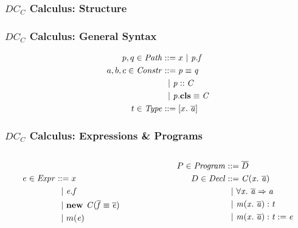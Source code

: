\begin{frame}
\frametitle{$DC_C$ Calculus: Structure}
\centering
{}
\end{frame}

\begin{frame}
\frametitle{$DC_C$ Calculus: General Syntax}

\begin{align*}
p, q \in \mathit{Path} &::= x \ |\ \mathit{p.f}\\
a, b, c \in \mathit{Constr} &::= \mathit{p} \equiv \mathit{q}\\
                &\ \ |\ \mathit{p} :: \mathit{C}\\
                &\ \ |\ \mathit{p}.\textbf{cls} \equiv \mathit{C}\\
t \in \mathit{Type} &::= [x.\ \mathit{\overline{a}}]
\end{align*}
\end{frame}

\begin{frame}
\frametitle{$DC_C$ Calculus: Expressions \& Programs}

\begin{columns}[t]
\begin{column}{0.4\linewidth}
\begin{align*}
\quad\\
e \in \mathit{Expr} &::= x\\
              &\ \ |\ \mathit{e.f}\\
              &\ \ |\ \textbf{new } \mathit{C}(\mathit{\overline{f}} \equiv \mathit{\overline{e}})\\
              &\ \ |\ m(\mathit{e})
\end{align*}
\end{column}
\begin{column}{0.58\linewidth}
\begin{align*}
P \in \mathit{Program} &::= \overline{D} \\
D \in \mathit{Decl} &::= \mathit{C}(\mathit{x}.\ \mathit{\overline{a}})\\
              &\ \ |\  \forall \mathit{x}.\ \mathit{\overline{a}} \Rightarrow \mathit{a}\\
              &\ \ |\ \mathit{m}(\mathit{x}.\ \mathit{\overline{a}}): \mathit{t}\\
              &\ \ |\ \mathit{m}(\mathit{x}.\ \mathit{\overline{a}}): \mathit{t} := \mathit{e}
\end{align*}
\end{column}
\end{columns}
\end{frame}

